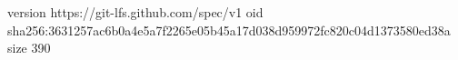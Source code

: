 version https://git-lfs.github.com/spec/v1
oid sha256:3631257ac6b0a4e5a7f2265e05b45a17d038d959972fc820c04d1373580ed38a
size 390
